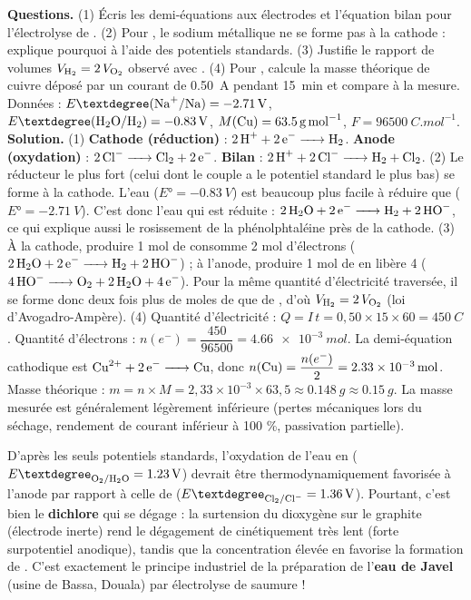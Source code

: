 \documentclass[11pt]{article}
\newcommand{\cle}[1]{{\popxbold\color{popdark}#1}}
\begin{document}
\begin{exoresolu}
\textbf{Questions.} (1) Écris les demi-équations aux électrodes et l'équation bilan pour l'électrolyse de . (2) Pour , le sodium métallique ne se forme pas à la cathode : explique pourquoi à l'aide des potentiels standards. (3) Justifie le rapport de volumes $V_{\ce{H2}} = 2\,V_{\ce{O2}}$ observé avec . (4) Pour , calcule la masse théorique de cuivre déposé par un courant de \SI{0,50}{A} pendant \SI{15}{min} et compare à la mesure. Données : $E°(\ce{Na+}/\ce{Na}) = \SI{-2,71}{V}$, $E°(\ce{H2O}/\ce{H2}) = \SI{-0,83}{V}$, $M(\ce{Cu}) = \SI{63,5}{g.mol^{-1}}$, $F = \SI{96500}{C.mol^{-1}}$.
\tcblower
\textbf{Solution.} 
(1) \textbf{Cathode (réduction)} : $\ce{2H+ + 2e- -> H2}$. \textbf{Anode (oxydation)} : $\ce{2Cl- -> Cl2 + 2e-}$. \textbf{Bilan} : $\ce{2H+ + 2Cl- -> H2 + Cl2}$.
(2) Le réducteur le plus fort (celui dont le couple a le potentiel standard le plus bas) se forme à la cathode. L'eau ($E° = \SI{-0,83}{V}$) est beaucoup plus facile à réduire que  ($E° = \SI{-2,71}{V}$). C'est donc l'eau qui est réduite : $\ce{2H2O + 2e- -> H2 + 2HO-}$, ce qui explique aussi le rosissement de la phénolphtaléine près de la cathode.
(3) À la cathode, produire 1 mol de  consomme 2 mol d'électrons ($\ce{2H2O + 2e- -> H2 + 2HO-}$) ; à l'anode, produire 1 mol de  en libère 4 ($\ce{4HO- -> O2 + 2H2O + 4e-}$). Pour la même quantité d'électricité traversée, il se forme donc deux fois plus de moles de  que de , d'où $V_{\ce{H2}} = 2\,V_{\ce{O2}}$ (loi d'Avogadro-Ampère).
(4) Quantité d'électricité : $Q = I\,t = 0{,}50 \times 15 \times 60 = \SI{450}{C}$. Quantité d'électrons : $n(e^-) = \dfrac{450}{96500} = \SI{4,66e-3}{mol}$. La demi-équation cathodique est $\ce{Cu^2+ + 2e- -> Cu}$, donc $n(\ce{Cu}) = \dfrac{n(e^-)}{2} = \SI{2,33e-3}{mol}$. Masse théorique : $m = n \times M = 2{,}33 \times 10^{-3} \times 63{,}5 \approx \SI{0,148}{g} \approx \SI{0,15}{g}$. La masse mesurée est généralement légèrement inférieure (pertes mécaniques lors du séchage, rendement de courant inférieur à 100 \%, passivation partielle).
\end{exoresolu}

\begin{attention}
D'après les seuls potentiels standards, l'oxydation de l'eau en  ($E°_{\ce{O2}/\ce{H2O}} = \SI{+1,23}{V}$) devrait être thermodynamiquement favorisée à l'anode par rapport à celle de  ($E°_{\ce{Cl2}/\ce{Cl-}} = \SI{+1,36}{V}$). Pourtant, c'est bien le \textbf{dichlore} qui se dégage : la \cle{surtension} du dioxygène sur le graphite (électrode inerte) rend le dégagement de  cinétiquement très lent (forte surpotentiel anodique), tandis que la concentration élevée en  favorise la formation de . C'est exactement le principe industriel de la préparation de l'\textbf{eau de Javel} (usine de Bassa, Douala) par électrolyse de saumure !
\end{attention}
\end{document}
